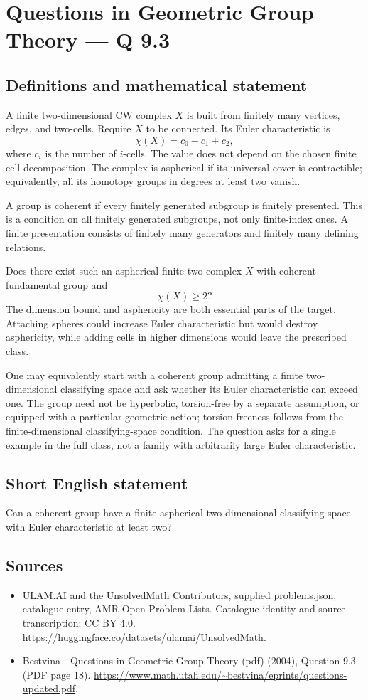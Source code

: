 \documentclass[11pt,a4paper]{article}
\begin{document}
\section*{Questions in Geometric Group Theory — Q 9.3}\label{statement}

\subsection{Definitions and mathematical statement}
A finite two-dimensional CW complex $X$ is built from finitely many vertices, edges, and two-cells. Require $X$ to be connected. Its Euler characteristic is
\[
 \chi(X)=c_0-c_1+c_2,
\]
where $c_i$ is the number of $i$-cells. The value does not depend on the chosen finite cell decomposition. The complex is aspherical if its universal cover is contractible; equivalently, all its homotopy groups in degrees at least two vanish.

A group is coherent if every finitely generated subgroup is finitely presented. This is a condition on all finitely generated subgroups, not only finite-index ones. A finite presentation consists of finitely many generators and finitely many defining relations.

Does there exist such an aspherical finite two-complex $X$ with coherent fundamental group and
\[
 \chi(X)\geq2?
\]
The dimension bound and asphericity are both essential parts of the target. Attaching spheres could increase Euler characteristic but would destroy asphericity, while adding cells in higher dimensions would leave the prescribed class.

One may equivalently start with a coherent group admitting a finite two-dimensional classifying space and ask whether its Euler characteristic can exceed one. The group need not be hyperbolic, torsion-free by a separate assumption, or equipped with a particular geometric action; torsion-freeness follows from the finite-dimensional classifying-space condition. The question asks for a single example in the full class, not a family with arbitrarily large Euler characteristic.
\subsection{Short English statement}
Can a coherent group have a finite aspherical two-dimensional classifying space with Euler characteristic at least two?
\subsection{Sources}
\begin{itemize}
\item[S1] ULAM.AI and the UnsolvedMath Contributors, supplied problems.json, catalogue entry, AMR Open Problem Lists. Catalogue identity and source transcription; CC BY 4.0.
\url{https://huggingface.co/datasets/ulamai/UnsolvedMath}.
\item[S2] Bestvina - Questions in Geometric Group Theory (pdf) (2004), Question 9.3 (PDF page 18). 
\url{https://www.math.utah.edu/~bestvina/eprints/questions-updated.pdf}.
\end{itemize}
\end{document}
